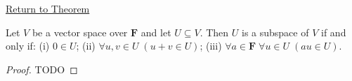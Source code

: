 \newpage
{}
\label{prf:conditions-for-a-subspace}

\begin{remark*}[Return]
\hyperref[thm:conditions-for-a-subspace]{Return to Theorem}
\end{remark*}

\begin{theorem*}
Let $V$ be a vector space over $\mathbf{F}$ and let $U \subseteq V$.
Then $U$ is a subspace of $V$ if and only if:
(i) $0 \in U$;
(ii) $\forall u,v \in U\;(u+v \in U)$;
(iii) $\forall a \in \mathbf{F}\;\forall u \in U\;(au \in U)$.
\end{theorem*}

\begin{proof}
TODO
\end{proof}
